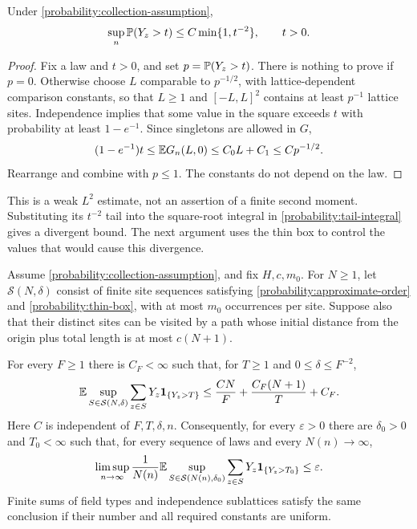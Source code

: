 \begin{lemma}
\label{probability:weak-two}
Under \eqref{probability:collection-assumption},
\[
                \sup_n\mathbb P(Y_z>t)\le C\min\{1,t^{-2}\},
                \qquad t>0.
\]
\end{lemma}

\begin{proof}
Fix a law and $t>0$, and set $p=\mathbb P(Y_z>t)$.  There is nothing
to prove if $p=0$.  Otherwise choose $L$ comparable to $p^{-1/2}$,
with lattice-dependent comparison constants, so that $L\ge1$ and
$[-L,L]^2$ contains at least $p^{-1}$ lattice sites.  Independence
implies that some value in the square exceeds $t$ with probability
at least $1-e^{-1}$.  Since singletons are allowed in $G$,
\[
 (1-e^{-1})t\le\mathbb E G_n(L,0)
                  \le C_0L+C_1\le Cp^{-1/2}.
\]
Rearrange and combine with $p\le1$.  The constants do not depend
on the law.
\end{proof}

This is a weak $L^2$ estimate, not an assertion of a finite second
moment.  Substituting its $t^{-2}$ tail into the square-root integral
in \eqref{probability:tail-integral} gives a divergent bound.  The
next argument uses the thin box to control the values that would
cause this divergence.

\begin{lemma}
\label{probability:thin-tails}
Assume \eqref{probability:collection-assumption}, and fix
$H,c,m_0$.  For $N\ge1$, let $\mathcal S(N,\delta)$ consist of
finite site sequences satisfying
\eqref{probability:approximate-order} and
\eqref{probability:thin-box}, with at most $m_0$ occurrences per
site.  Suppose also that their distinct sites can be visited by a
path whose initial distance from the origin plus total length is
at most $c(N+1)$.

For every $F\ge1$ there is $C_F<\infty$ such that, for $T\ge1$
and $0\le\delta\le F^{-2}$,
\begin{equation}
 \mathbb E\sup_{S\in\mathcal S(N,\delta)}
       \sum_{z\in S}Y_z\mathbf1_{\{Y_z>T\}}
 \le \frac{CN}{F}+\frac{C_F(N+1)}{T}+C_F.
 \label{probability:thin-tail-bound}
\end{equation}
Here $C$ is independent of $F,T,\delta,n$.  Consequently, for
every $\varepsilon>0$ there are $\delta_0>0$ and $T_0<\infty$
such that, for every sequence of laws and every $N(n)\to\infty$,
\[
 \limsup_{n\to\infty}\frac1{N(n)}
 \mathbb E\sup_{S\in\mathcal S(N(n),\delta_0)}
       \sum_{z\in S}Y_z\mathbf1_{\{Y_z>T_0\}}
 \le\varepsilon.
\]
Finite sums of field types and independence sublattices satisfy
the same conclusion if their number and all required constants
are uniform.
\end{lemma}

